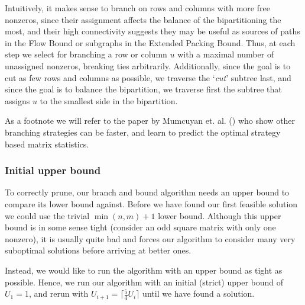 	Intuitively, it makes sense to branch on rows and columns with more free
	nonzeros, since their assignment affects the balance of the bipartitioning
	the most, and their high connectivity suggests they may be useful as
	sources of paths in the Flow Bound or subgraphs in the Extended Packing
	Bound. Thus, at each step we select for branching a row or column $u$
	with a maximal
	number of unassigned nonzeros, breaking ties arbitrarily. Additionally,
	since the goal is to cut as few rows and columns as possible, we traverse
	the `\textit{cut}' subtree last, and since the goal is to balance the
	bipartition, we traverse first the subtree that assigns $u$ to the smallest
	side in the bipartition.

	As a footnote we will refer to the paper by Mumcuyan et. al.
	(\cite{mumcuyan18}) who show
	other branching strategies can be faster, and learn to predict the optimal
	strategy based matrix statistics.
	
	\subsubsection{Initial upper bound}

	To correctly prune, our branch and bound algorithm needs an upper bound to
	compare its lower bound against. Before we have found our first feasible
	solution we could use the trivial $\min(n, m) + 1$ lower bound. Although
	this upper bound is in some sense tight (consider an odd square matrix
	with only one nonzero), it is usually quite bad and forces our algorithm
	to consider many very suboptimal solutions before arriving at better ones.

	Instead, we would like to run the algorithm with an upper bound as tight
	as possible. Hence, we run our algorithm with an initial (strict) upper
	bound of $U_1 = 1$, and rerun with
	$U_{i+1} = \lceil \frac{5}{4} U_i \rceil$ until we have found a solution.
